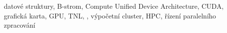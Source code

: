 datové struktury, B-strom, Compute Unified Device Architecture, CUDA, grafická karta, GPU, TNL, \CC, výpočetní cluster, HPC, řízení paralelního zpracování